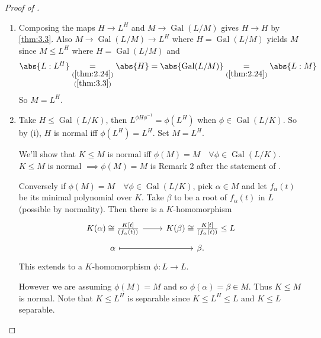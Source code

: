 \documentclass{article}
\DeclareMathOperator{\Gal}{Gal}
\begin{document}
\begin{proof}[Proof of ]
    \leavevmode
    \begin{enumerate}[label=(\roman*)]
        \item Composing the maps $H \longrightarrow L^H$ and $M \longrightarrow \Gal(L /M)$ gives $H \longrightarrow H$ by \cref{thm:3.3}.
            Also $M \longrightarrow \Gal(L/M) \longrightarrow L^H$ where $H = \Gal(L/M)$ yields $M$ since $M \leq L^H$ where $H = \Gal(L/M)$ and
            \begin{equation*}
                \abs{L:L^H} \underset{\begin{subarray}{c}(\ref{thm:2.24})\\(\ref{thm:3.3})\end{subarray}}{=} \abs{H} = \abs{\Gal(L/M)} \underset{(\ref{thm:2.24})}{=} \abs{L:M}
            \end{equation*}
            So $M = L^H$.
        \item Take $H \leq \Gal(L/K)$, then $L^{\phi H \phi^{-1}} = \phi(L^H)$ when $\phi \in \Gal(L/K)$.
            So by (i), $H$ is normal iff $\phi(L^H) = L^H$. Set $M = L^H$.

            We'll show that $K \leq M$ is normal iff $\phi(M) = M \quad \forall \phi \in \Gal(L/K)$.
            $K \leq M$ is normal $\implies \phi(M) = M$ is Remark 2 after the statement of .

            Conversely if $\phi(M) = M \quad \forall \phi \in \Gal(L/K)$, pick $\alpha \in M$ and let $f_\alpha(t)$ be its minimal polynomial over $K$.
            Take $\beta$ to be a root of $f_\alpha(t)$ in $L$ (possible by normality).
            Then there is a $K$-homomorphism
            \begin{equation*}
                \begin{tikzcd}[row sep=tiny]
                    K(\alpha) \cong \frac{K[t]}{(f_\alpha(t))} \ar[r] & K(\beta) \cong \frac{K[t]}{(f_\alpha(t))} \leq L \\
                    \alpha \ar[r, mapsto] & \beta.
                \end{tikzcd}
            \end{equation*}
            This extends to a $K$-homomorphism $\phi:L \to L$.

            However we are assuming $\phi(M) = M$ and so $\phi(\alpha) = \beta \in M$. Thus $K \leq M$ is normal.
            Note that $K \leq L^H$ is separable since $K \leq L^H \leq L$ and $K \leq L$ separable.


\end{enumerate}
\end{proof}
\end{document}
